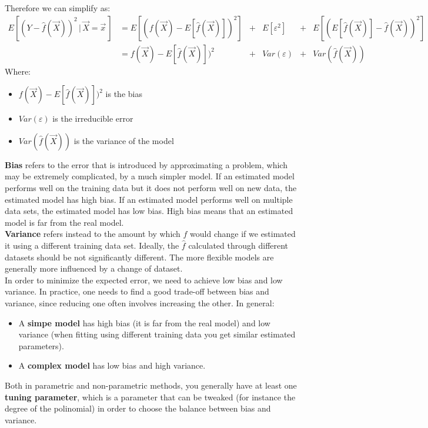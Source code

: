     Therefore we can simplify as:
    \begin{align*}
    E[(Y-\hat{f}(\vec{X}))^2 \,|\, \vec{X} = \vec{x}\,]
    & = E[(f(\vec{X}) - E[\hat{f}(\vec{X})])^2] &+ &E[\varepsilon^2] &+ &E[(E[\hat{f}(\vec{X})] - \hat{f}(\vec{X}))^2] \\
    & = f(\vec{X}) - E[\hat{f}(\vec{X})])^2 &+ &Var(\varepsilon) &+ &Var(\hat{f}(\vec{X})) 
    \end{align*} 
    Where:
    \begin{itemize}
      \item $f(\vec{X}) - E[\hat{f}(\vec{X})])^2$ is the bias
      \item $Var(\varepsilon)$ is the irreducible error
      \item $Var(\hat{f}(\vec{X}))$ is the variance of the model
    \end{itemize}
    \textbf{Bias} refers to the error that is introduced by approximating a problem, which may be extremely complicated, by a much
    simpler model. If an estimated model performs well on the training data but it does not perform well on new data, the estimated model has high bias. If an estimated model performs well on multiple data sets, the estimated model has low bias. High bias means that an estimated model is far from the real model. \\
    \textbf{Variance} refers instead to the amount by which $\hat{f}$ would change if we
    estimated it using a different training data set. Ideally, the $\hat{f}$ calculated 
    through different datasets should be not significantly different. The more flexible models are generally more influenced
    by a change of dataset. \\
    In order to minimize the expected error, we need to achieve low bias and low variance. In practice, one needs to find a good trade-off between bias and variance, since reducing one often involves increasing the other. In general:
    \begin{itemize}
      \item A \textbf{simpe model} has high bias (it is far from the real model) and low variance (when fitting using different training data you get similar estimated parameters).
      \item A \textbf{complex model} has low bias and high variance.
    \end{itemize}
    Both in parametric and non-parametric methods, you generally have at least one \textbf{tuning parameter}, which is a parameter that can be tweaked (for instance the degree of the polinomial) in order to choose the balance between bias and variance.
